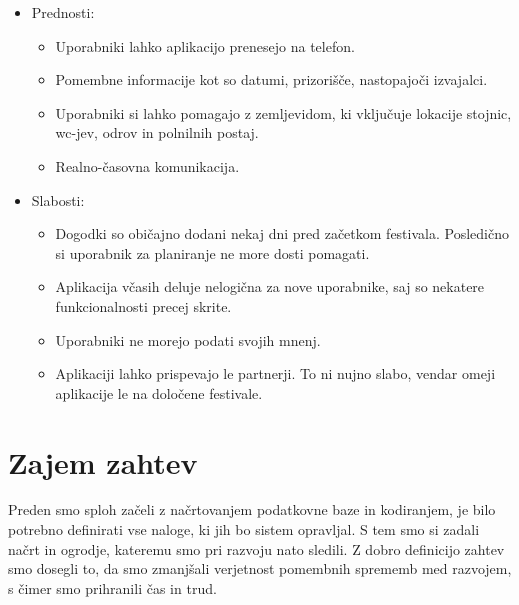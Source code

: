 \documentclass[a4paper,12pt,openright]{book}
\begin{document}
\begin{itemize}
    \item Prednosti:
        \begin{itemize}
            \item Uporabniki lahko aplikacijo prenesejo na telefon.
            \item Pomembne informacije kot so datumi, prizorišče, nastopajoči izvajalci.
            \item Uporabniki si lahko pomagajo z zemljevidom, ki vključuje lokacije stojnic, wc-jev, odrov in polnilnih postaj.
            \item Realno-časovna komunikacija.
        \end{itemize}
    \item Slabosti:
        \begin{itemize}
            \item Dogodki so običajno dodani nekaj dni pred začetkom festivala. Posledično si uporabnik za planiranje ne more dosti pomagati.
            \item Aplikacija včasih deluje nelogična za nove uporabnike, saj so nekatere funkcionalnosti precej skrite.
            \item Uporabniki ne morejo podati svojih mnenj.
            \item Aplikaciji lahko prispevajo le partnerji. To ni nujno slabo, vendar omeji aplikacije le na določene festivale.
        \end{itemize}
\end{itemize}

\chapter{Zajem zahtev}
Preden smo sploh začeli z načrtovanjem podatkovne baze in kodiranjem, je bilo potrebno definirati vse naloge, ki jih bo sistem opravljal.
S tem smo si zadali načrt in ogrodje, kateremu smo pri razvoju nato sledili.
Z dobro definicijo zahtev smo dosegli to, da smo zmanjšali verjetnost pomembnih sprememb med razvojem, s čimer smo prihranili čas in trud.
\end{document}
